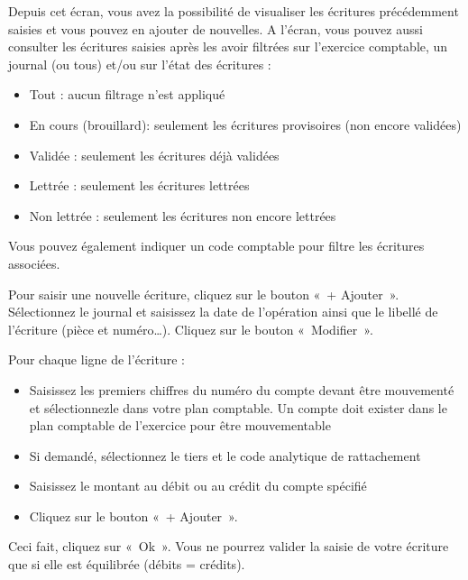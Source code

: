\documentclass[a4paper,10pt,oneside,french]{sphinxmanual}
\begin{document}
Depuis cet écran, vous avez la possibilité de visualiser les écritures précédemment saisies et vous pouvez en ajouter de nouvelles.
A l’écran, vous pouvez aussi consulter les écritures saisies après les avoir filtrées sur l’exercice comptable, un journal (ou tous)  et/ou sur l’état des écritures :
\begin{itemize}
\item {} 
Tout : aucun filtrage n’est appliqué

\item {} 
En cours (brouillard): seulement les écritures provisoires (non encore validées)

\item {} 
Validée : seulement les écritures déjà validées

\item {} 
Lettrée : seulement les écritures lettrées

\item {} 
Non lettrée : seulement les écritures non encore lettrées

\end{itemize}

Vous pouvez également indiquer un code comptable pour filtre les écritures associées.

Pour saisir une nouvelle écriture, cliquez sur le bouton « + Ajouter ».
Sélectionnez le journal et saisissez la date de l’opération ainsi que le libellé de l’écriture (pièce et numéro…). Cliquez sur le bouton « Modifier ».

Pour chaque ligne de l’écriture :
\begin{itemize}
\item {} 
Saisissez les premiers chiffres du numéro du compte devant être mouvementé et sélectionnez\sphinxhyphen{}le dans votre plan comptable. Un compte doit exister dans le plan comptable de l’exercice pour être mouvementable

\item {} 
Si demandé, sélectionnez le tiers et le code analytique de rattachement

\item {} 
Saisissez le montant au débit ou au crédit du compte spécifié

\item {} 
Cliquez sur le bouton « + Ajouter ».

\end{itemize}

Ceci fait, cliquez sur « Ok ». Vous ne pourrez valider la saisie de votre écriture que si elle est équilibrée (débits = crédits).
\end{document}
